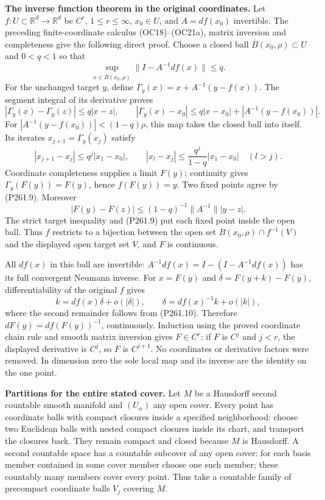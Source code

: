 \documentclass[
  11pt,
]{article}
\begin{document}
\textbf{The inverse function theorem in the original coordinates.} Let
\(f:U\subset\mathbb R^d\to\mathbb R^d\) be \(C^r\), \(1\le r\le\infty\),
\(x_0\in U\), and \(A=df(x_0)\) invertible. The preceding
finite-coordinate calculus (OC18)--(OC21a), matrix inversion and
completeness give the following direct proof. Choose a closed ball
\(\overline B(x_0,\rho)\subset U\) and \(0<q<1\) so that \[
 \sup_{x\in\overline B(x_0,\rho)}\|I-A^{-1}df(x)\|\le q.
 \tag{P261.8}
\] For the unchanged target \(y\), define
\(\Gamma_y(x)=x+A^{-1}(y-f(x))\). The segment integral of its derivative
proves \[
 |\Gamma_y(x)-\Gamma_y(z)|\le q|x-z|,\qquad
 |\Gamma_y(x)-x_0|\le q|x-x_0|+|A^{-1}(y-f(x_0))|.
 \tag{P261.9}
\] For \(|A^{-1}(y-f(x_0))|<(1-q)\rho\), this map takes the closed ball
into itself. Its iterates \(x_{j+1}=\Gamma_y(x_j)\) satisfy \[
 |x_{j+1}-x_j|\le q^j|x_1-x_0|,\qquad
 |x_l-x_j|\le \frac{q^j}{1-q}|x_1-x_0|\quad(l>j).
\] Coordinate completeness supplies a limit \(F(y)\); continuity gives
\(\Gamma_y(F(y))=F(y)\), hence \(f(F(y))=y\). Two fixed points agree by
(P261.9). Moreover \[
 |F(y)-F(z)|\le (1-q)^{-1}\|A^{-1}\||y-z|.
 \tag{P261.10}
\] The strict target inequality and (P261.9) put each fixed point inside
the open ball. Thus \(f\) restricts to a bijection between the open set
\(B(x_0,\rho)\cap f^{-1}(V)\) and the displayed open target set \(V\),
and \(F\) is continuous.

All \(df(x)\) in this ball are invertible:
\(A^{-1}df(x)=I-(I-A^{-1}df(x))\) has its full convergent Neumann
inverse. For \(x=F(y)\) and \(\delta=F(y+k)-F(y)\), differentiability of
the original \(f\) gives \[
 k=df(x)\delta+o(|\delta|),\qquad
 \delta=df(x)^{-1}k+o(|k|),
 \tag{P261.11}
\] where the second remainder follows from (P261.10). Therefore
\(dF(y)=df(F(y))^{-1}\), continuously. Induction using the proved
coordinate chain rule and smooth matrix inversion gives \(F\in C^r\): if
\(F\) is \(C^j\) and \(j<r\), the displayed derivative is \(C^j\), so
\(F\) is \(C^{j+1}\). No coordinates or derivative factors were removed.
In dimension zero the sole local map and its inverse are the identity on
the one point.

\textbf{Partitions for the entire stated cover.} Let \(M\) be a
Hausdorff second countable smooth manifold and \((U_\alpha)\) any open
cover. Every point has coordinate balls with compact closures inside a
specified neighborhood: choose two Euclidean balls with nested compact
closures inside its chart, and transport the closures back. They remain
compact and closed because \(M\) is Hausdorff. A second countable space
has a countable subcover of any open cover: for each basis member
contained in some cover member choose one such member; these countably
many members cover every point. Thus take a countable family of
precompact coordinate balls \(V_j\) covering \(M\).
\end{document}
